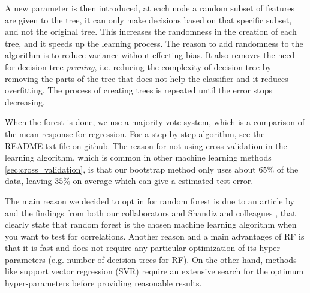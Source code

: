A new parameter is then introduced, at each node a random subset of features are given to the tree, it can only make decisions based on that specific subset, and not the original tree. This increases the randomness in the creation of each tree, and it speeds up the learning process. The reason to add randomness to the algorithm is to reduce variance without effecting bias. It also removes the need for decision tree \textit{pruning}, i.e. reducing the complexity of decision tree by removing the parts of the tree that does not help the classifier and it reduces overfitting. The process of creating trees is repeated until the error stops decreasing.

When the forest is done, we use a majority vote system, which is a comparison of the mean response for regression. For a step by step algorithm, see the README.txt file on \href{https://github.com/sondrt/Machine-Learning-the-Voltage-Capacity-and-Energy-density-of-Electrode-Materials}{github}.
The reason for not using cross-validation in the learning algorithm, which is common in other machine learning methods \ref{sec:cross_validation}, is that our bootstrap method only uses about $65\%$ of the data, leaving $35\%$ on average which can give a estimated test error.

The main reason we decided to opt in for random forest is due to an article by \cite{fernandez2014we} and the findings from both our collaborators \cite{tsamardinos2020automated} and Shandiz and colleagues \cite{shandiz2016application}, that clearly state that random forest is the chosen machine learning algorithm when you want to test for correlations. Another reason and a main advantages of RF is that it is fast and does not require any particular optimization of its hyper-parameters (e.g. number of decision trees for RF). On the other hand, methods like support vector regression (SVR) require an extensive search for the optimum hyper-parameters before providing reasonable results.

	
